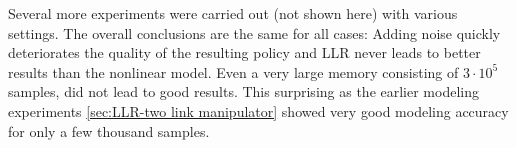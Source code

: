 Several more experiments were carried out (not shown here) with various settings. The overall conclusions are the same for all cases: Adding noise quickly deteriorates the quality of the resulting policy and \ac{LLR} never leads to better results than the nonlinear model. Even a very large memory consisting of $3\cdot10^5$ samples, did not lead to good results. This surprising as the earlier modeling experiments \ref{sec:LLR-two link manipulator} showed very good modeling accuracy for only a few thousand samples.
\begin{figure}[ht]
	\centering
	\\
\end{figure}
